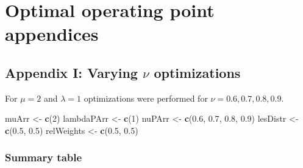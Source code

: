 \documentclass[
]{book}
\newenvironment{Shaded}{\begin{snugshade}}{\end{snugshade}}
\newcommand{\DecValTok}[1]{\textcolor[rgb]{0.00,0.00,0.81}{#1}}
\newcommand{\FloatTok}[1]{\textcolor[rgb]{0.00,0.00,0.81}{#1}}
\newcommand{\KeywordTok}[1]{\textcolor[rgb]{0.13,0.29,0.53}{\textbf{#1}}}
\newcommand{\NormalTok}[1]{#1}
\newcommand{\StringTok}[1]{\textcolor[rgb]{0.31,0.60,0.02}{#1}}
\begin{document}
\hypertarget{optim-op-point-appendices}{%
\chapter{Optimal operating point appendices}\label{optim-op-point-appendices}}

\hypertarget{optim-op-point-vary-nu}{%
\section{\texorpdfstring{Appendix I: Varying \(\nu\) optimizations}{Appendix I: Varying \textbackslash nu optimizations}}\label{optim-op-point-vary-nu}}

For \(\mu = 2\) and \(\lambda = 1\) optimizations were performed for \(\nu = 0.6, 0.7, 0.8, 0.9\).

\begin{Shaded}
\begin{Highlighting}[]
\NormalTok{muArr <-}\StringTok{ }\KeywordTok{c}\NormalTok{(}\DecValTok{2}\NormalTok{)}
\NormalTok{lambdaPArr <-}\StringTok{ }\KeywordTok{c}\NormalTok{(}\DecValTok{1}\NormalTok{)}
\NormalTok{nuPArr <-}\StringTok{ }\KeywordTok{c}\NormalTok{(}\FloatTok{0.6}\NormalTok{, }\FloatTok{0.7}\NormalTok{, }\FloatTok{0.8}\NormalTok{, }\FloatTok{0.9}\NormalTok{)}
\NormalTok{lesDistr <-}\StringTok{ }\KeywordTok{c}\NormalTok{(}\FloatTok{0.5}\NormalTok{, }\FloatTok{0.5}\NormalTok{)}
\NormalTok{relWeights <-}\StringTok{ }\KeywordTok{c}\NormalTok{(}\FloatTok{0.5}\NormalTok{, }\FloatTok{0.5}\NormalTok{)}
\end{Highlighting}
\end{Shaded}

\hypertarget{summary-table-2}{%
\subsection{Summary table}\label{summary-table-2}}
\end{document}
